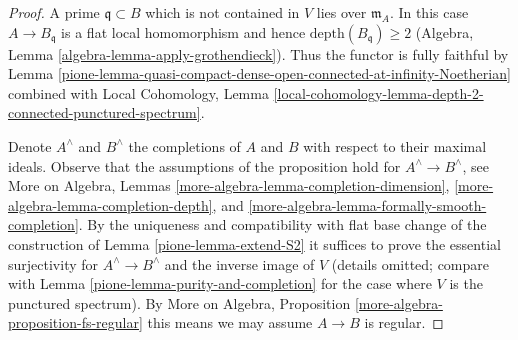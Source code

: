 \begin{proof}

A prime $\mathfrak q \subset B$ which is not contained in $V$
lies over $\mathfrak m_A$. In this case $A \to B_\mathfrak q$
is a flat local homomorphism and hence $\text{depth}(B_\mathfrak q) \geq 2$
(Algebra, Lemma \ref{algebra-lemma-apply-grothendieck}).
Thus the functor is fully faithful by
Lemma \ref{pione-lemma-quasi-compact-dense-open-connected-at-infinity-Noetherian}
combined with Local Cohomology,
Lemma \ref{local-cohomology-lemma-depth-2-connected-punctured-spectrum}.

\medskip\noindent
Denote $A^\wedge$ and $B^\wedge$ the completions of $A$ and $B$
with respect to their maximal ideals. Observe that the assumptions
of the proposition hold for $A^\wedge \to B^\wedge$, see
More on Algebra, Lemmas
\ref{more-algebra-lemma-completion-dimension},
\ref{more-algebra-lemma-completion-depth}, and
\ref{more-algebra-lemma-formally-smooth-completion}.
By the uniqueness and compatibility with flat base change
of the construction of  Lemma \ref{pione-lemma-extend-S2}
it suffices to prove the essential surjectivity for
$A^\wedge \to B^\wedge$ and the inverse image of $V$
(details omitted; compare with Lemma \ref{pione-lemma-purity-and-completion}
for the case where $V$ is the punctured spectrum).
By More on Algebra, Proposition \ref{more-algebra-proposition-fs-regular}
this means we may assume $A \to B$ is regular.


\end{proof}
